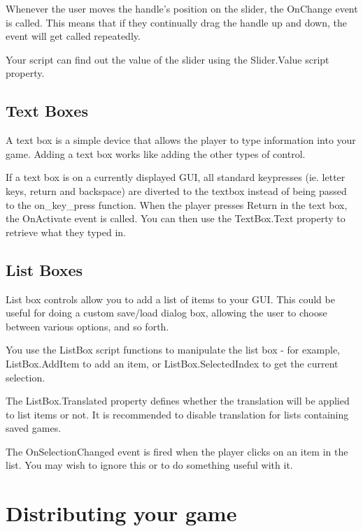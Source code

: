 Whenever the user moves the handle's position on the slider, the OnChange event is
called. This means that if they continually drag the handle up and down,
the event will get called repeatedly.

Your script can find out the value of the slider using the Slider.Value script property.

\subsection{Text Boxes}%

A text box is a simple device that allows the player to type information into
your game. Adding a text box works like adding the other types of control.

If a text box is on a currently displayed GUI, all standard keypresses (ie.
letter keys, return and backspace) are diverted to the textbox instead of
being passed to the on_key_press function. When the player presses Return in
the text box, the OnActivate event is called. You can then use the TextBox.Text
property to retrieve what they typed in.

\subsection{List Boxes}%

List box controls allow you to add a list of items to your GUI. This could
be useful for doing a custom save/load dialog box, allowing the user to
choose between various options, and so forth.

You use the ListBox script functions to manipulate the list box - for
example, ListBox.AddItem to add an item, or ListBox.SelectedIndex to get the current
selection.

The ListBox.Translated property defines whether the translation will be applied to list items or not. It is recommended to disable translation for lists containing saved games.

The OnSelectionChanged event is fired when the player clicks on an item in the list.
You may wish to ignore this or to do something useful with it.

\section{Distributing your game}\label{DistGame}%

